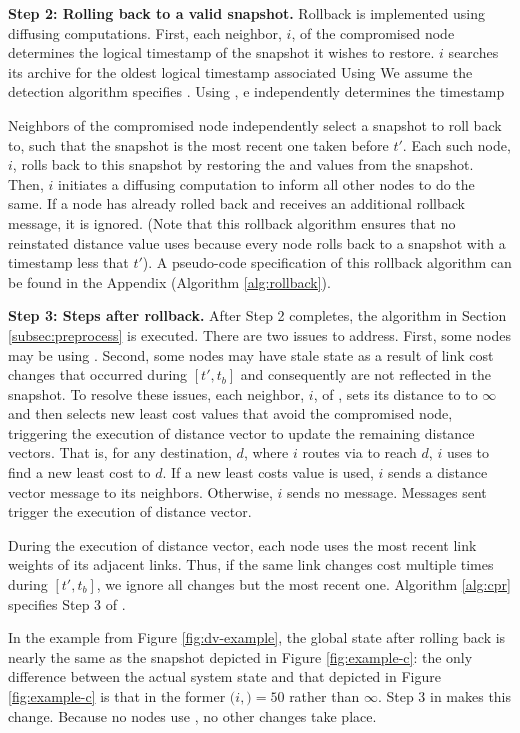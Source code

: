 {\bf Step 2: Rolling back to a valid snapshot.} 
Rollback is implemented using diffusing computations. First, each neighbor, $i$, of the compromised node determines the logical timestamp of the snapshot it wishes to restore.  
$i$ searches its archive for the oldest logical timestamp associated 
Using \badvector
 We assume the detection algorithm specifies \badvector.  Using \badvectors, e
independently determines the timestamp

Neighbors of the compromised node independently select a snapshot to roll back to, such that the snapshot is the most recent one taken
before $t'$.  Each such node, $i$, rolls back to this snapshot by restoring the \minvi and \dmatrixi values from the snapshot.  Then, $i$ initiates a diffusing computation to inform all other
nodes to do the same. If a node has already rolled back and receives an additional rollback message, it is ignored. 
(Note that this rollback algorithm ensures that no reinstated distance value uses \badvector because every node rolls back to a snapshot 
with a timestamp less that $t'$).  A pseudo-code specification of this rollback algorithm can be found in the Appendix (Algorithm \ref{alg:rollback}).  


{\bf Step 3: Steps after rollback.} After Step 2 completes, the algorithm in Section \ref{subsec:preprocess} is executed.
There are two issues to address.
First, some nodes may be using \oldvectors.  Second, some nodes may have stale state as a result of link cost changes that occurred during $[t',t_b]$ and 
consequently are not reflected in the snapshot. 
To resolve these issues, each neighbor, $i$, of \bads, sets its distance to \bad to $\infty$ and then selects new least cost values that avoid the compromised node, triggering
the execution of distance vector to update the remaining distance vectors.  That is, for any destination, $d$, where $i$ routes via \bad to reach $d$,
$i$ uses \dmatrixi to find a new least cost to $d$. If a new least costs value is used, $i$ sends a distance vector message to its neighbors. Otherwise, $i$ sends no message.
Messages sent trigger the execution of distance vector.

During the execution of distance vector, each node uses the most recent link weights of its adjacent links. Thus, 
if the same link changes cost multiple times during  $[t',t_b]$, we ignore all changes but the most recent one. Algorithm \ref{alg:cpr} specifies Step 3 of \cprs.

In the example from Figure \ref{fig:dv-example}, the global state after rolling back is nearly the same as the snapshot depicted in Figure \ref{fig:example-c}:
the only difference between the actual system state and that depicted in Figure \ref{fig:example-c} is that in the former 
$(i,$\bads$)=50$ rather than $\infty$. Step 3 in \cpr makes this change.  Because no nodes use \oldvectors, no other changes take place.

